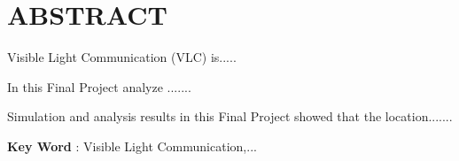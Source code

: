 
\chapter*{ABSTRACT}
\vspace*{0.7cm}
Visible Light Communication (VLC) is..... \par
In this Final Project analyze .......\par
Simulation and analysis results in this Final Project showed that the location.......
\vspace*{1 cm}

\noindent\textbf{Key Word} : Visible Light Communication,...
\newpage

\newpage